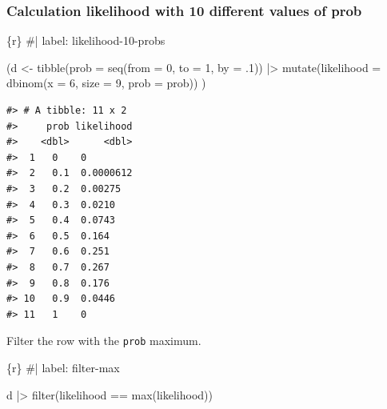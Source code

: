 \documentclass[
  letterpaper,
  DIV=11,
  numbers=noendperiod]{scrreprt}
\newenvironment{Shaded}{\begin{snugshade}}{\end{snugshade}}
\newcommand{\AttributeTok}[1]{\textcolor[rgb]{0.40,0.45,0.13}{#1}}
\newcommand{\CommentTok}[1]{\textcolor[rgb]{0.37,0.37,0.37}{#1}}
\newcommand{\DecValTok}[1]{\textcolor[rgb]{0.68,0.00,0.00}{#1}}
\newcommand{\FunctionTok}[1]{\textcolor[rgb]{0.28,0.35,0.67}{#1}}
\newcommand{\InformationTok}[1]{\textcolor[rgb]{0.37,0.37,0.37}{#1}}
\newcommand{\NormalTok}[1]{\textcolor[rgb]{0.00,0.23,0.31}{#1}}
\newcommand{\OtherTok}[1]{\textcolor[rgb]{0.00,0.23,0.31}{#1}}
\newcommand{\SpecialCharTok}[1]{\textcolor[rgb]{0.37,0.37,0.37}{#1}}
\begin{document}
\hypertarget{sec-calcu-10-probs}{%
\subsubsection{Calculation likelihood with 10 different values of
prob}\label{sec-calcu-10-probs}}

\begin{Shaded}
\begin{Highlighting}[]
\InformationTok{\textasciigrave{}\textasciigrave{}\textasciigrave{}\{r\}}
\CommentTok{\#| label: likelihood{-}10{-}probs}

\NormalTok{(d }\OtherTok{\textless{}{-}} \FunctionTok{tibble}\NormalTok{(}\AttributeTok{prob =} \FunctionTok{seq}\NormalTok{(}\AttributeTok{from =} \DecValTok{0}\NormalTok{, }\AttributeTok{to =} \DecValTok{1}\NormalTok{, }\AttributeTok{by =}\NormalTok{ .}\DecValTok{1}\NormalTok{)) }\SpecialCharTok{|\textgreater{}} 
    \FunctionTok{mutate}\NormalTok{(}\AttributeTok{likelihood =} \FunctionTok{dbinom}\NormalTok{(}\AttributeTok{x =} \DecValTok{6}\NormalTok{, }\AttributeTok{size =} \DecValTok{9}\NormalTok{, }\AttributeTok{prob =}\NormalTok{ prob))}
\NormalTok{)}
\InformationTok{\textasciigrave{}\textasciigrave{}\textasciigrave{}}
\end{Highlighting}
\end{Shaded}

\begin{verbatim}
#> # A tibble: 11 x 2
#>     prob likelihood
#>    <dbl>      <dbl>
#>  1   0    0        
#>  2   0.1  0.0000612
#>  3   0.2  0.00275  
#>  4   0.3  0.0210   
#>  5   0.4  0.0743   
#>  6   0.5  0.164    
#>  7   0.6  0.251    
#>  8   0.7  0.267    
#>  9   0.8  0.176    
#> 10   0.9  0.0446   
#> 11   1    0
\end{verbatim}

Filter the row with the \texttt{prob} maximum.

\begin{Shaded}
\begin{Highlighting}[]
\InformationTok{\textasciigrave{}\textasciigrave{}\textasciigrave{}\{r\}}
\CommentTok{\#| label: filter{-}max}

\NormalTok{d  }\SpecialCharTok{|\textgreater{}}  
    \FunctionTok{filter}\NormalTok{(likelihood }\SpecialCharTok{==} \FunctionTok{max}\NormalTok{(likelihood))}
\InformationTok{\textasciigrave{}\textasciigrave{}\textasciigrave{}}
\end{Highlighting}
\end{Shaded}
\end{document}
